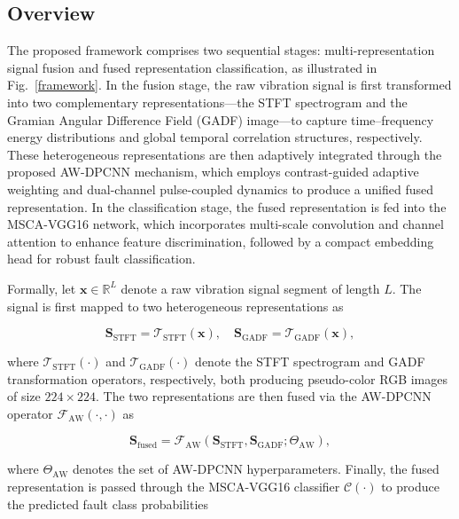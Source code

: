 \documentclass[journal]{IEEEtran}
\begin{document}
\subsection{Overview}

The proposed framework comprises two sequential stages: multi-representation signal fusion and fused representation classification, as illustrated in Fig.~\ref{framework}. In the fusion stage, the raw vibration signal is first transformed into two complementary representations—the STFT spectrogram and the Gramian Angular Difference Field (GADF) image—to capture time--frequency energy distributions and global temporal correlation structures, respectively. These heterogeneous representations are then adaptively integrated through the proposed AW-DPCNN mechanism, which employs contrast-guided adaptive weighting and dual-channel pulse-coupled dynamics to produce a unified fused representation. In the classification stage, the fused representation is fed into the MSCA-VGG16 network, which incorporates multi-scale convolution and channel attention to enhance feature discrimination, followed by a compact embedding head for robust fault classification.

Formally, let $\boldsymbol{x} \in \mathbb{R}^{L}$ denote a raw vibration signal segment of length $L$. The signal is first mapped to two heterogeneous representations as

\begin{equation}
\boldsymbol{S}_{\mathrm{STFT}} = \mathcal{T}_{\mathrm{STFT}}(\boldsymbol{x}), \quad
\boldsymbol{S}_{\mathrm{GADF}} = \mathcal{T}_{\mathrm{GADF}}(\boldsymbol{x}),
\label{eq:pipeline_rep}
\end{equation}

where $\mathcal{T}_{\mathrm{STFT}}(\cdot)$ and $\mathcal{T}_{\mathrm{GADF}}(\cdot)$ denote the STFT spectrogram and GADF transformation operators, respectively, both producing pseudo-color RGB images of size $224 \times 224$. The two representations are then fused via the AW-DPCNN operator $\mathcal{F}_{\mathrm{AW}}(\cdot, \cdot)$ as

\begin{equation}
\boldsymbol{S}_{\mathrm{fused}} = \mathcal{F}_{\mathrm{AW}}(\boldsymbol{S}_{\mathrm{STFT}}, \boldsymbol{S}_{\mathrm{GADF}}; \Theta_{\mathrm{AW}}),
\label{eq:pipeline_fuse}
\end{equation}

where $\Theta_{\mathrm{AW}}$ denotes the set of AW-DPCNN hyperparameters. Finally, the fused representation is passed through the MSCA-VGG16 classifier $\mathcal{C}(\cdot)$ to produce the predicted fault class probabilities
\end{document}
